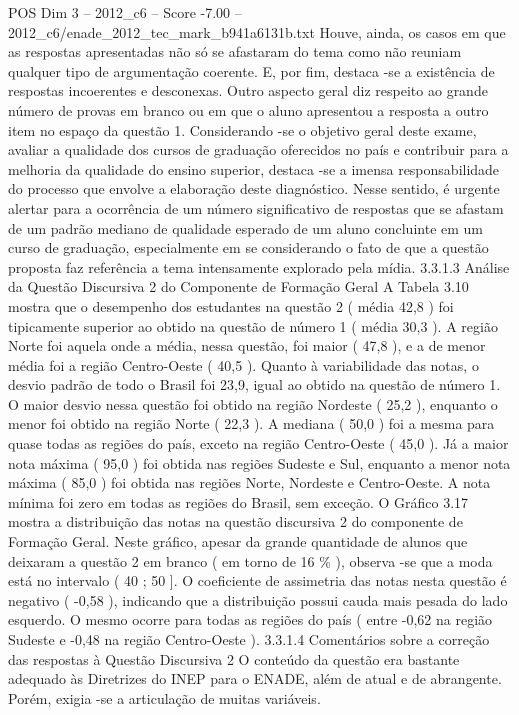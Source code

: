 \begin{textsample}{POS Dim 3 – 2012\_c6 – Score -7.00 – 2012\_c6/enade\_2012\_tec\_mark\_b941a6131b.txt}
Houve, ainda, os casos em que as respostas apresentadas não só se afastaram do tema como não reuniam qualquer tipo de argumentação coerente.
E, por fim, destaca -se a existência de respostas incoerentes e desconexas.
Outro aspecto geral diz respeito ao grande número de provas em branco ou em que o aluno apresentou a resposta a outro item no espaço da questão 1.
Considerando -se o objetivo geral deste exame, avaliar a qualidade dos cursos de graduação oferecidos no país e contribuir para a melhoria da qualidade do ensino superior, destaca -se a imensa responsabilidade do processo que envolve a elaboração deste diagnóstico.
Nesse sentido, é urgente alertar para a ocorrência de um número significativo de respostas que se afastam de um padrão mediano de qualidade esperado de um aluno concluinte em um curso de graduação, especialmente em se considerando o fato de que a questão proposta faz referência a tema intensamente explorado pela mídia. 3.3.1.3 Análise da Questão Discursiva 2 do Componente de Formação Geral A Tabela 3.10 mostra que o desempenho dos estudantes na questão 2 ( média 42,8 ) foi tipicamente superior ao obtido na questão de número 1 ( média 30,3 ).
A região Norte foi aquela onde a média, nessa questão, foi maior ( 47,8 ), e a de menor média foi a região Centro-Oeste ( 40,5 ).
Quanto à variabilidade das notas, o desvio padrão de todo o Brasil foi 23,9, igual ao obtido na questão de número 1.
O maior desvio nessa questão foi obtido na região Nordeste ( 25,2 ), enquanto o menor foi obtido na região Norte ( 22,3 ).
A mediana ( 50,0 ) foi a mesma para quase todas as regiões do país, exceto na região Centro-Oeste ( 45,0 ).
Já a maior nota máxima ( 95,0 ) foi obtida nas regiões Sudeste e Sul, enquanto a menor nota máxima ( 85,0 ) foi obtida nas regiões Norte, Nordeste e Centro-Oeste.
A nota mínima foi zero em todas as regiões do Brasil, sem exceção.
O Gráfico 3.17 mostra a distribuição das notas na questão discursiva 2 do componente de Formação Geral.
Neste gráfico, apesar da grande quantidade de alunos que deixaram a questão 2 em branco ( em torno de 16 \% ), observa -se que a moda está no intervalo ( 40 ; 50 ].
O coeficiente de assimetria das notas nesta questão é negativo ( -0,58 ), indicando que a distribuição possui cauda mais pesada do lado esquerdo.
O mesmo ocorre para todas as regiões do país ( entre -0,62 na região Sudeste e -0,48 na região Centro-Oeste ). 3.3.1.4 Comentários sobre a correção das respostas à Questão Discursiva 2 O conteúdo da questão era bastante adequado às Diretrizes do INEP para o ENADE, além de atual e de abrangente.
Porém, exigia -se a articulação de muitas variáveis.

\end{textsample}
